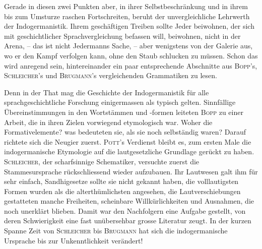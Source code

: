 {Gerade in diesen zwei Punkten aber, in ihrer Selbstbeschränkung und in ihrem bis zum Umsturze raschen Fortschreiten, beruht der unvergleichliche Lehrwerth der Indogermanistik. Ihrem geschäftigen Treiben sollte Jeder beiwohnen, der sich mit geschichtlicher Sprachvergleichung befassen will, beiwohnen, nicht in der Arena, – das ist nicht Jedermanns Sache, – aber wenigstens von der Galerie aus, wo er den Kampf verfolgen kann, ohne den Staub schlucken zu müssen. Schon das wird anregend sein, hintereinander ein paar entsprechende Abschnitte aus \textsc{Bopp}’s, \textsc{Schleicher}’s und \textsc{Brugmann}’s vergleichenden Grammatiken zu lesen.
\largerpage

Denn in der That mag die Geschichte der Indogermanistik für alle sprachgeschichtliche Forschung einigermassen als typisch gelten. Sinnfällige Übereinstimmungen in den Wortstämmen und -formen leiteten \textsc{Bopp} zu einer Arbeit, die in ihren Zielen vorwiegend etymologisch war. Woher die Formativelemente? was bedeuteten sie, als sie noch selbständig waren? Darauf richtete sich die Neugier zuerst. \textsc{Pott}’s Verdienst bleibt \label{fp.182} es, zum ersten Male die indogermanische Etymologie auf die lautgesetzliche Grundlage gerückt zu haben. \textsc{Schleicher}, der scharfsinnige Schematiker, versuchte zuerst die Stammesursprache rückschliessend wieder aufzubauen. Ihr Lautwesen galt ihm für sehr einfach, Sandhigesetze sollte sie nicht gekannt haben, die volllautigsten Formen wurden als die alter\-thümlichsten angesehen, die Lautverschiebungen gestatteten manche Freiheiten, scheinbare Willkürlichkeiten und Ausnahmen, die noch unerklärt blieben. Damit war den Nachfolgern eine Aufgabe gestellt, von deren Schwierigkeit eine fast unübersehbar grosse Literatur zeugt.  In der kurzen Spanne Zeit von \textsc{Schleicher} bis \textsc{Brugmann} hat sich die indogermanische Ursprache bis zur Unkenntlichkeit verändert! 

}
